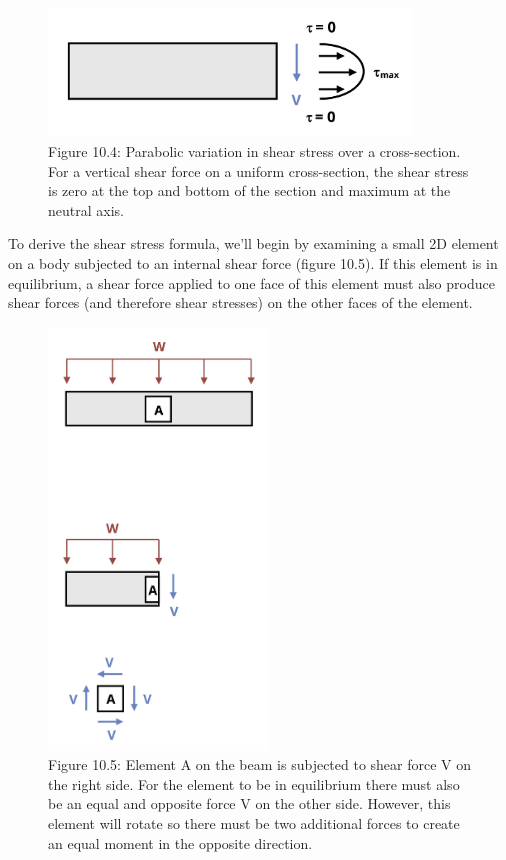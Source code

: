 \documentclass[
  letterpaper,
  DIV=11,
  numbers=noendperiod]{scrreprt}
\theoremstyle{definition}
\theoremstyle{remark}
\begin{document}
\begin{figure}[H]

{\centering \includegraphics[width=3.78125in,height=\textheight]{images/CH10 PNGs/figure 10.4.png}

}

\caption{Figure 10.4: Parabolic variation in shear stress over a
cross-section. For a vertical shear force on a uniform cross-section,
the shear stress is zero at the top and bottom of the section and
maximum at the neutral axis.}

\end{figure}%

To derive the shear stress formula, we'll begin by examining a small 2D
element on a body subjected to an internal shear force (figure 10.5). If
this element is in equilibrium, a shear force applied to one face of
this element must also produce shear forces (and therefore shear
stresses) on the other faces of the element.

\begin{figure}[H]

{\centering \includegraphics[width=2.28125in,height=\textheight]{images/CH10 PNGs/figure 10.5.png}

}

\caption{Figure 10.5: Element A on the beam is subjected to shear force
V on the right side. For the element to be in equilibrium there must
also be an equal and opposite force V on the other side. However, this
element will rotate so there must be two additional forces to create an
equal moment in the opposite direction.}

\end{figure}%
\end{document}
